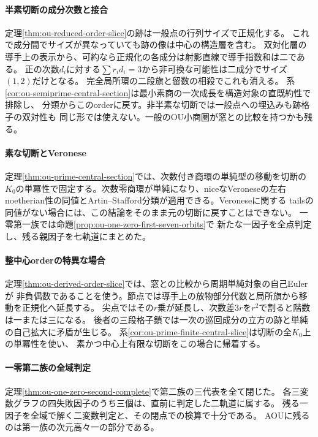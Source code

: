 \documentclass[11pt,a4paper]{ltjsarticle}
\begin{document}
\paragraph{半素切断の成分次数と接合}
定理\ref{thm:ou-reduced-order-slice}の跡は一般点の行列サイズで正規化する。
これで成分間でサイズが異なっていても跡の像は中心の構造層を含む。
双対化層の導手上の表示から、可約なら正規化の各成分は射影直線で導手指数和は二である。
正の次数$d_i$に対する$\sum r_id_i=3$から非可換な可能性は二成分でサイズ$(1,2)$だけとなる。
完全局所環の二段旗と留数の相殺でこれも消える。
系\ref{cor:ou-semiprime-central-section}は最小素商の一次成長を構造対象の直既約性で排除し、
分類からこのorderに戻す。非半素な切断では一般点への埋込みも跡格子の双対性も
同じ形では使えない。一般のOU小商圏が窓との比較を持つかも残る。

\paragraph{素な切断とVeronese}
定理\ref{thm:ou-prime-central-section}では、次数付き商環の単純型の移動を切断の
$K_0$の単冪性で固定する。次数零商環が単純になり、niceなVeroneseの左右
noetherian性の同値とArtin--Stafford分類が適用できる。Veroneseに関する
tailsの同値がない場合には、この結論をそのまま元の切断に戻すことはできない。
一零第一族では命題\ref{prop:ou-one-zero-first-seven-orbits}で
新たな一因子を全点判定し、残る親因子を七軌道にまとめた。

\paragraph{整中心orderの特異な場合}
定理\ref{thm:ou-derived-order-slice}では、窓との比較から周期単純対象の自己Eulerが
非負偶数であることを使う。節点では導手上の放物部分代数と局所旗から移動を正規化へ延長する。
尖点ではその$r$乗が延長し、次数差$3r$を$r^2$で割ると階数は一または三になる。
後者の三段格子鎖では一次の巡回成分の立方の跡と単純の自己拡大に矛盾が生じる。
系\ref{cor:ou-prime-finite-central-slice}は切断の全$K_0$上の単冪性を使い、
素かつ中心上有限な切断をこの場合に帰着する。

\paragraph{一零第二族の全域判定}
定理\ref{thm:ou-one-zero-second-complete}で第二族の三代表を全て閉じた。
各三変数グラフの四失敗因子のうち三個は、直前に判定した二軌道に属する。
残る一因子を全域で解く二変数判定と、その閉点での検算で十分である。
AOUに残るのは第一族の次元高々一の部分である。
\end{document}
